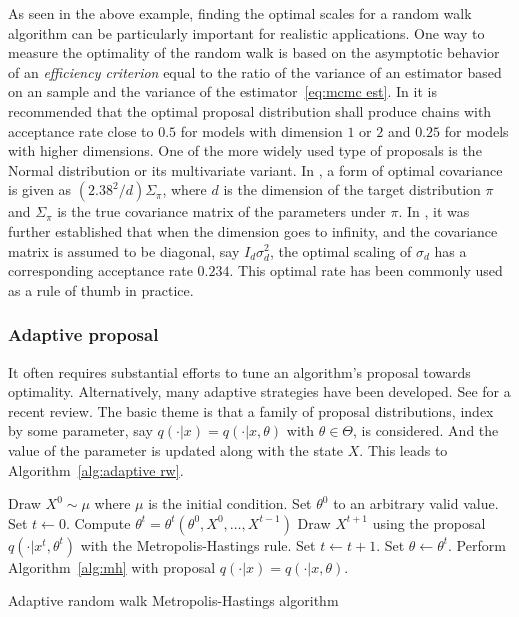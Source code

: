 
As seen in the above example, finding the optimal scales for a random walk
algorithm can be particularly important for realistic applications. One way to
measure the optimality of the random walk is based on the asymptotic behavior
of an \emph{efficiency criterion} equal to the ratio of the variance of an
estimator based on an \iid sample and the variance of the
estimator~\ref{eq:mcmc est}. In \cite{Roberts:1997dg} it is recommended that
the optimal proposal distribution shall produce chains with acceptance rate
close to $0.5$ for models with dimension $1$ or $2$ and $0.25$ for models with
higher dimensions. One of the more widely used type of proposals is the Normal
distribution or its multivariate variant. In \cite{Gelman:1995vx}, a form of
optimal covariance is given as $(2.38^2/d)\Sigma_{\pi}$, where $d$ is the
dimension of the target distribution $\pi$ and $\Sigma_{\pi}$ is the true
covariance matrix of the parameters under $\pi$. In \cite{Roberts:2001ta}, it
was further established that when the dimension goes to infinity, and the
covariance matrix is assumed to be diagonal, say $I_d\sigma_d^2$, the optimal
scaling of $\sigma_d$ has a corresponding acceptance rate $0.234$. This
optimal rate has been commonly used as a rule of thumb in practice.

\subsubsection{Adaptive proposal}
\label{ssub:Adaptive proposal}

It often requires substantial efforts to tune an algorithm's proposal towards
optimality. Alternatively, many adaptive strategies have been developed. See
\cite{Andrieu:2008kh} for a recent review. The basic theme is that a family of
proposal distributions, index by some parameter, say $q(\cdot|x) = q(\cdot|x,
\theta)$ with $\theta\in\Theta$, is considered. And the value of the parameter
is updated along with the state $X$. This leads to Algorithm~\ref{alg:adaptive
  rw}.

\begin{algorithm}
\begin{algorithmic}
  \tophrule
  \STATE Draw $X^0\sim\mu$ where $\mu$ is the initial condition.
  \STATE Set $\theta^0$ to an arbitrary valid value.
  \STATE Set $t\leftarrow0$.
  \REPEAT
      \STATE Compute $\theta^t = \theta^t(\theta^0,X^0,\dots,X^{t-1})$
      \STATE Draw $X^{t + 1}$ using the proposal $q(\cdot|x^t,\theta^t)$ with
      the Metropolis-Hastings rule.
      \STATE Set $t\leftarrow t+1$.
  \STATE Set $\theta\leftarrow\theta^t$.
  \STATE Perform Algorithm~\ref{alg:mh} with proposal $q(\cdot|x) =
  q(\cdot|x,\theta)$.
  \bottomhrule
\end{algorithmic}
\caption{Adaptive random walk Metropolis-Hastings algorithm}
\label{alg:adaptive rw}
\end{algorithm}

